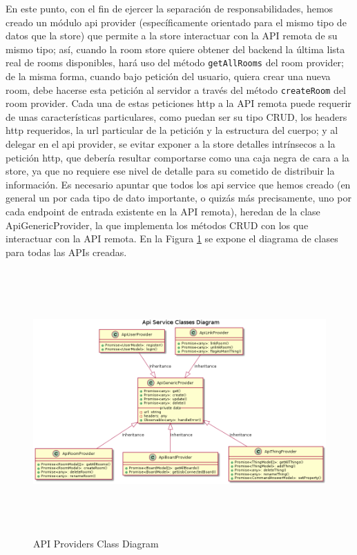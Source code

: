 En este punto, con el fin de ejercer la separación de responsabilidades, hemos creado un módulo api provider (específicamente orientado para el mismo tipo de datos que la store) que permite a la store interactuar con la API remota de su mismo tipo; así, cuando la room store quiere obtener del backend la última lista real de rooms disponibles, hará uso del método \verb|getAllRooms| del room provider; de la misma forma, cuando bajo petición del usuario, quiera crear una nueva room, debe hacerse esta petición al servidor a través del método \verb|createRoom| del room provider. Cada una de estas peticiones http a la API remota puede requerir de unas características particulares, como puedan ser su tipo CRUD, los headers http requeridos, la url particular de la petición y la estructura del cuerpo; y al delegar en el api provider, se evitar exponer a la store detalles intrínsecos a la petición http, que debería resultar comportarse como una caja negra de cara a la store, ya que no requiere ese nivel de detalle para su cometido de distribuir la información. 
Es necesario apuntar que todos los api service que hemos creado (en general un por cada tipo de dato importante, o quizás más precisamente, uno por cada endpoint de entrada existente en la API remota), heredan de la clase ApiGenericProvider, la que implementa los métodos CRUD con los que interactuar con la API remota. En la Figura \ref{fig:api-services} se expone el diagrama de clases para todas las APIs creadas.

\begin{figure}[hbt!]
\centering
\includegraphics[height=4in]{figures/diagrams/front/architecture/api-services.png}
\caption[api-services]{API Providers Class Diagram\footnotemark}
\label{fig:api-services}
\end{figure}


